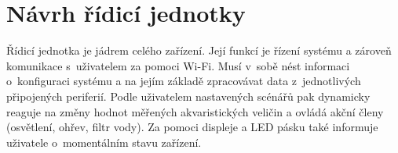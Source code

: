 \chapter{Návrh řídicí jednotky}
    Řídicí jednotka je jádrem celého zařízení. Její funkcí je řízení systému a zároveň komunikace s~uživatelem za pomoci Wi-Fi. Musí v~sobě nést informaci o~konfiguraci systému a na jejím základě zpracovávat data z~jednotlivých připojených periferií. Podle uživatelem nastavených scénářů pak dynamicky reaguje na změny hodnot měřených akvaristických veličin a ovládá akční členy (osvětlení, ohřev, filtr vody). Za pomoci displeje a LED pásku také informuje uživatele o~momentálním stavu zařízení. 

    

    \clearpage
    
    

            